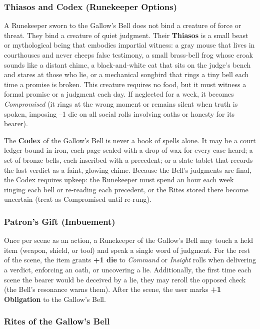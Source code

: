 \subsubsection*{Thiasos and Codex (Runekeeper Options)}

A Runekeeper sworn to the Gallow's Bell does not bind a creature of force or threat. They bind a creature of quiet judgment. Their \textbf{Thiasos} is a small beast or mythological being that embodies impartial witness: a gray mouse that lives in courthouses and never cheeps false testimony, a small brass-bell frog whose croak sounds like a distant chime, a black-and-white cat that sits on the judge's bench and stares at those who lie, or a mechanical songbird that rings a tiny bell each time a promise is broken. This creature requires no food, but it must witness a formal promise or a judgment each day. If neglected for a week, it becomes \textit{Compromised} (it rings at the wrong moment or remains silent when truth is spoken, imposing --1 die on all social rolls involving oaths or honesty for its bearer).

The \textbf{Codex} of the Gallow's Bell is never a book of spells alone. It may be a court ledger bound in iron, each page sealed with a drop of wax for every case heard; a set of bronze bells, each inscribed with a precedent; or a slate tablet that records the last verdict as a faint, glowing chime. Because the Bell's judgments are final, the Codex requires upkeep: the Runekeeper must spend an hour each week ringing each bell or re-reading each precedent, or the Rites stored there become uncertain (treat as Compromised until re-rung).

\subsubsection*{Patron's Gift (Imbuement)}

Once per scene as an action, a Runekeeper of the Gallow's Bell may touch a held item (weapon, shield, or tool) and speak a single word of judgment. For the rest of the scene, the item grants \textbf{+1 die} to \textit{Command} or \textit{Insight} rolls when delivering a verdict, enforcing an oath, or uncovering a lie. Additionally, the first time each scene the bearer would be deceived by a lie, they may reroll the opposed check (the Bell's resonance warns them). After the scene, the user marks \textbf{+1 Obligation} to the Gallow's Bell.

\subsubsection*{Rites of the Gallow's Bell}

